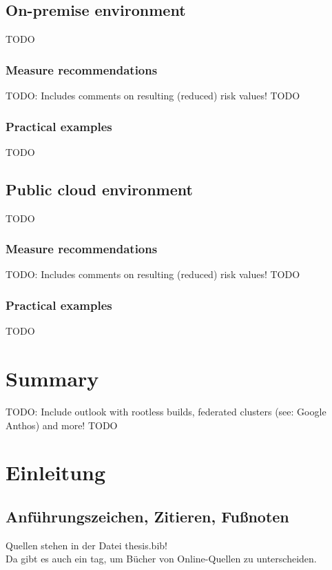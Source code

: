 \section{On-premise environment}
TODO

\subsection{Measure recommendations}
TODO: Includes comments on resulting (reduced) risk values!
TODO

\subsection{Practical examples}
TODO

\section{Public cloud environment}
TODO

\subsection{Measure recommendations}
TODO: Includes comments on resulting (reduced) risk values!
TODO

\subsection{Practical examples}
TODO

\chapter{Summary}
TODO: Include outlook with rootless builds, federated clusters (see: Google Anthos) and more!
TODO



\chapter{Einleitung}
\section{Anführungszeichen, Zitieren, Fußnoten} 
\label{kap:beschda}
Quellen stehen in der Datei thesis.bib!\\
Da gibt es auch ein tag, um Bücher von Online-Quellen zu unterscheiden.\\

